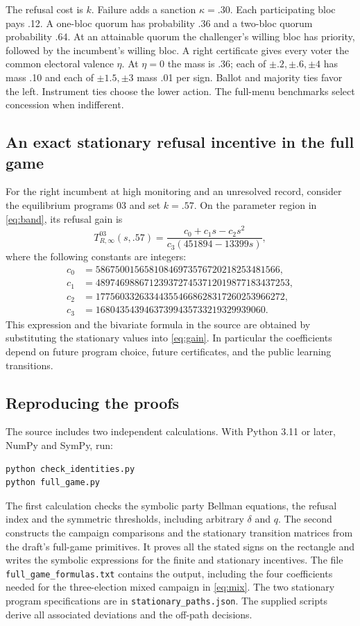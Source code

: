 \documentclass[11pt,letterpaper]{article}
\begin{document}
The refusal cost is \(k\). Failure adds a sanction \(\kappa=.30\). Each participating bloc pays .12. A one-bloc quorum has probability .36 and a two-bloc quorum probability .64. At an attainable quorum the challenger's willing bloc has priority, followed by the incumbent's willing bloc. A right certificate gives every voter the common electoral valence \(\eta\). At \(\eta=0\) the mass is .36; each of \(\pm.2,\pm.6,\pm4\) has mass .10 and each of \(\pm1.5,\pm3\) mass .01 per sign. Ballot and majority ties favor the left. Instrument ties choose the lower action. The full-menu benchmarks select concession when indifferent.

\newpage
\subsection*{An exact stationary refusal incentive in the full game}
For the right incumbent at high monitoring and an unresolved record, consider the equilibrium programs \(03\) and set \(k=.57\). On the parameter region in \eqref{eq:band}, its refusal gain is
\[
 T_{R,\infty}^{03}(s,.57)=
 \frac{c_0+c_1s-c_2s^2}{c_3(451894-13399s)},
\]
where the following constants are integers:
\begin{align*}
 c_0&=58675001565810846973576720218253481566,\\
 c_1&=4897469886712393727453712019877183437253,\\
 c_2&=177560332633443554668628317260253966272,\\
 c_3&=16804354394637399435733219329939060 .
\end{align*}
This expression and the bivariate formula in the source are obtained by substituting the stationary values into \eqref{eq:gain}. In particular the coefficients depend on future program choice, future certificates, and the public learning transitions.

\subsection*{Reproducing the proofs}
The source includes two independent calculations. With Python 3.11 or later, NumPy and SymPy, run:
\begin{verbatim}
python check_identities.py
python full_game.py
\end{verbatim}
The first calculation checks the symbolic party Bellman equations, the refusal index and the symmetric thresholds, including arbitrary \(\delta\) and \(q\). The second constructs the campaign comparisons and the stationary transition matrices from the draft's full-game primitives. It proves all the stated signs on the rectangle and writes the symbolic expressions for the finite and stationary incentives. The file \texttt{full\_game\_formulas.txt} contains the output, including the four coefficients needed for the three-election mixed campaign in \eqref{eq:mix}. The two stationary program specifications are in \texttt{stationary\_paths.json}. The supplied scripts derive all associated deviations and the off-path decisions.
\end{document}
